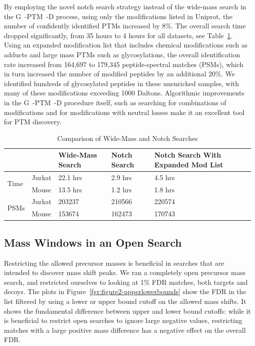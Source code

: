 \documentclass[journal=jprobs,manuscript=article]{achemso}
\begin{document}
By employing the novel notch search strategy instead of the wide-mass search in the G~-PTM~-D process, using only the modifications listed in Uniprot, the number of confidently identified PTMs increased by 8\%. The overall search time dropped significantly, from 35 hours to 4 hours for all datasets, see Table~\ref{my-label}. Using an expanded modification list that includes chemical modifications such as adducts and large mass PTMs such as glycosylations, the overall identification rate increased from 164,697 to 179,345 peptide-spectral matches (PSMs), which in turn increased the number of modified peptides by an additional 20\%. We identified hundreds of glycosylated peptides in these unenriched samples, with many of these modifications exceeding 1000 Daltons. Algorithmic improvements in the G~-PTM~-D procedure itself, such as searching for combinations of modifications and for modifications with neutral losses make it an excellent tool for PTM discovery.

\begin{table}[]
\centering
\caption{Comparison of Wide-Mass and Notch Searches}
\label{my-label}
\begin{tabular}{ll|l|l|l}
                      &        & Wide-Mass Search & Notch Search & Notch Search With Expanded Mod List \\
\hline
\multirow{2}{*}{Time} & Jurkat & 22.1 hrs         & 2.9 hrs   &  4.5 hrs  \\
                      & Mouse  & 13.5 hrs         & 1.2 hrs   &  1.8 hrs \\
\hline
\multirow{2}{*}{PSMs} & Jurkat & 203237           & 210566   &  220574  \\
                      & Mouse  & 153674           & 162473   &   170743
\end{tabular}
\end{table}


\subsection{Mass Windows in an Open Search}

Restricting the allowed precursor masses is beneficial in searches that are intended to discover mass shift peaks. We ran a completely open precursor mass search, and restricted ourselves to looking at 1\% FDR matches, both targets and decoys. The plots in Figure~\ref{fgr:figure2-upperlowerbounds} show the FDR in the list filtered by using a lower or upper bound cutoff on the allowed mass shifts. It shows the fundamental difference between upper and lower bound cutoffs: while it is beneficial to restrict open searches to ignore large negative values, restricting matches with a large positive mass difference has a negative effect on the overall FDR.
\end{document}

